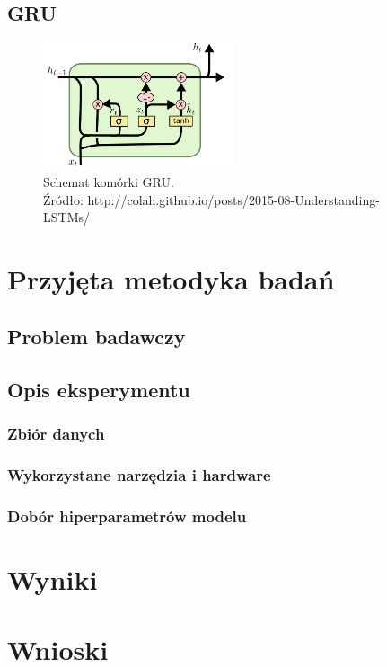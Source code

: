 \documentclass[oneside, mag]{mgr}
\begin{document}
\section{GRU}

\begin{figure}
\centering
	\includegraphics[width=0.5\textwidth]{img/LSTM3-var-GRU.png}
	\caption{Schemat komórki GRU.\\ Źródło: http://colah.github.io/posts/2015-08-Understanding-LSTMs/}
	\label{fig:gru}
\end{figure}

\chapter{Przyjęta metodyka badań}


\section{Problem badawczy}


\section{Opis eksperymentu}

\subsection{Zbiór danych}

\subsection{Wykorzystane narzędzia i hardware}

\subsection{Dobór hiperparametrów modelu}


\chapter{Wyniki}


\chapter{Wnioski}



\tableofcontents

\listoffigures
\end{document}
